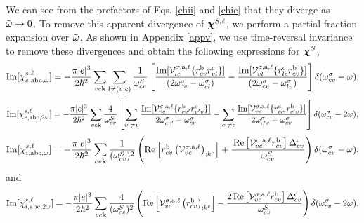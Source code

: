 \documentclass[floatfix,prb,aps,superscriptaddress,11pt,preprint,letterpaper]{revtex4}
\begin{document}
We can see from the prefactors of Eqs. \eqref{chii} and \eqref{chie} 
that they diverge as $\tilde\omega\to 0$. To remove this apparent divergence of 
$\boldsymbol{\chi}^{S,\ell}$, we perform a partial fraction expansion over $\tilde\omega$. 
As shown in Appendix \ref{appv}, we use time-reversal invariance to 
remove these divergences and obtain the following expressions for $\boldsymbol{\chi}^S$,
\begin{equation}\label{calvimchiewn}
\mathrm{Im}[\chi_{e,\mathrm{a}\mathrm{b}\mathrm{c},\omega}^{s,\ell}] =
-\frac{\pi |e|^3}{2\hbar^2}\sum_{vc\mathbf{k}}\sum_{l\neq(v,c)}\frac{1}{\omega^{S}_{cv}}
\left[
\frac{\mathrm{Im}[\mathcal{V}^{\sigma,\text{a},\ell}_{lc}\{r^{\mathrm{b}}_{cv}r^{\mathrm{c}}_{vl}\}]}
{(2\omega^\sigma_{cv}-\omega^\sigma_{cl})} 
-\frac{\mathrm{Im}[\mathcal{V}^{\sigma,\text{a},\ell}_{vl}\{r^{\mathrm{c}}_{lc}r^{\mathrm{b}}_{cv}\}]}
{(2\omega^\sigma_{cv}-\omega^\sigma_{lv})}
\right]\delta(\omega^\sigma_{cv}-\omega),
\end{equation}  
\begin{equation}\label{calvimchie2wn}
\mathrm{Im}[\chi_{e,\mathrm{a}\mathrm{b}\mathrm{c},2\omega}^{s,\ell}] =
-\frac{\pi |e|^3}{2\hbar^2}\sum_{vc\mathbf{k}}\frac{4}{\omega^{S}_{cv}}
\left[
\sum_{v'\ne
  v}\frac{\mathrm{Im}[\mathcal{V}^{\sigma,\text{a},\ell}_{vc}\{r^{\mathrm{b}}_{cv'}r^{\mathrm{c}}_{v'v}\}]}
{2\omega^\sigma_{cv'}-\omega^\sigma_{cv}}
- \sum_{c'\ne
  c}\frac{\mathrm{Im}[\mathcal{V}^{\sigma,\text{a},\ell}_{vc}\{r^{\mathrm{c}}_{cc'}r^{\mathrm{b}}_{c'v}\}]}
{2\omega^\sigma_{c'v}-\omega^\sigma_{cv}}
\right]\delta(\omega^\sigma_{cv}-2\omega),
\end{equation}
\begin{equation}\label{calvimchiwn}
\mathrm{Im}[\chi_{i,\text{a}\text{b}\text{c},\omega}^{s,\ell}]
= -\frac{\pi\vert e\vert^3}{2\hbar^2}\sum_{cv\mathbf{k}}\frac{1}{(\omega^{S}_{cv})^{2}}
\left(
\mathrm{Re}\left[r^{\text{b}}_{cv}\left(\mathcal{V}^{\sigma,\text{a},\ell}_{vc}\right)_{;k^{\text{c}}}\right]
+\frac{\,\mathrm{Re}\left[\mathcal{V}^{\sigma,\text{a},\ell}_{vc}r^{\text{b}}_{cv}\right]
\Delta^{\text{c}}_{cv}}{\omega^{S}_{cv}} 
\right)\delta(\omega^\sigma_{cv}-\omega),
\end{equation}
and
\begin{equation}\label{calvimchi2wn}
\mathrm{Im}[\chi_{i,\text{a}\text{b}\text{c},2\omega}^{s,\ell}] 
=
 -\frac{\pi \vert
   e\vert^{3}}{2\hbar^2}\sum_{vc\mathbf{k}}\frac{4}{(\omega^{S}_{cv})^{2}}
\left(\mathrm{Re}\left[\mathcal{V}^{\sigma,\text{a},\ell}_{vc}\left(r^{\text{b}}_{cv}\right)_{;k^{\text{c}}}
\right] -
\frac{2\,\mathrm{Re}\left[\mathcal{V}^{\sigma,\text{a},\ell}_{vc}r^{\text{b}}_{cv}\right]
\Delta^{\text{c}}_{cv}}{\omega^{S}_{cv}}\right)\delta(\omega^\sigma_{cv}-2\omega)
,
\end{equation}
\end{document}
